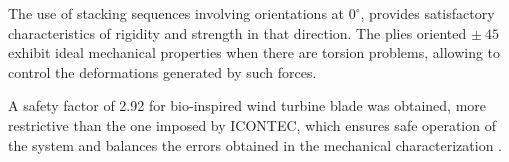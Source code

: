 The use of stacking sequences involving orientations at $0^\circ$, provides satisfactory characteristics of rigidity and strength in that direction. The plies oriented $\pm~45$ exhibit ideal mechanical properties when there are torsion problems, allowing to control the deformations generated by such forces.


A safety factor of 2.92 for bio-inspired wind turbine blade was obtained, more restrictive than the one imposed by ICONTEC, which ensures safe operation of the system and balances the errors obtained in the mechanical characterization \cite{icontec}.
%
%




%
%



